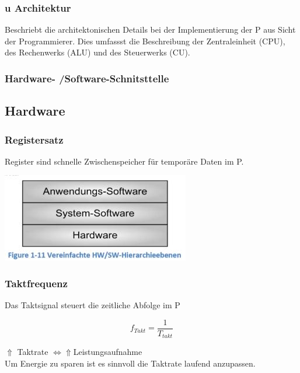 \subsubsection{u Architektur}
Beschriebt die architektonischen Details bei der Implementierung der \mu P aus Sicht der Programmierer.
Dies umfassst die Beschreibung der Zentraleinheit (CPU), des Rechenwerks (ALU) und des Steuerwerks (CU).

\subsubsection{Hardware- /Software-Schnitsttelle}
\begin{minipage}{10cm}
\subsection{Hardware}
\subsubsection{Registersatz}
Register sind schnelle Zwischenspeicher für temporäre Daten im \mu P.
\end{minipage}
\begin{minipage}{5cm}
\includegraphics{images/HardwareSoftware}
\end{minipage}

\subsubsection{Taktfrequenz}
Das Taktsignal steuert die zeitliche Abfolge im \mu P \newline
\begin{multicols}{2}
        \begin{minipage}{\linewidth}
    \[ f_{Takt}= \frac{1}{T_{takt}} \]
        \end{minipage}
    
    \begin{minipage}{\linewidth}
        $ \Uparrow $ Taktrate $ \Leftrightarrow $$  \Uparrow  $Leistungsaufnahme \\
        Um Energie zu sparen ist es sinnvoll die Taktrate laufend anzupassen.\\
    \end{minipage}
\end{multicols}
